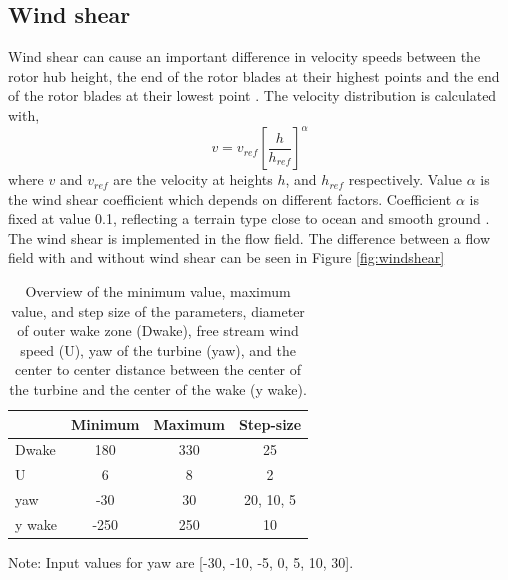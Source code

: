 \subsection{Wind shear}
Wind shear can cause an important difference in velocity speeds between the rotor hub height, the end of the rotor blades at their highest points and the end of the rotor blades at their lowest point \cite{Firtin2011}.  The velocity distribution is calculated with, 
\begin{equation}
\label{eq:shear}
v = v_{ref} \left[\frac{h}{h_{ref}}\right]^\alpha
\end{equation}
where $v$ and $v_{ref}$ are the velocity at heights $h$, and $h_{ref}$  respectively. Value $\alpha$ is the wind shear coefficient which depends on different factors. Coefficient $\alpha$ is fixed at value 0.1, reflecting a terrain type close to ocean and smooth ground \cite{Firtin2011}. The wind shear is implemented in the flow field. The difference between a flow field with and without wind shear can be seen in Figure \ref{fig:windshear}





\begin{table}[h]
	\caption{Overview of the minimum value, maximum value, and step size of the parameters, diameter of outer wake zone (Dwake), free stream wind speed (U), yaw of the turbine (yaw), and the center to center distance between the center of the turbine and the center of the wake (y wake).}
	\centering
	\label{tab:pars}
	\begin{tabular}{lccc}
		\hline
	 	& Minimum & Maximum & Step-size \\ 
		\hline
		Dwake & 180 & 330 & 25 \\
		U & 6 & 8 & 2 \\
		yaw & -30 & 30 & 20, 10, 5 \\
		y wake & -250 & 250 & 10 \\
		\hline
	\end{tabular}
Note: Input values for yaw are [-30, -10, -5, 0, 5, 10, 30].
\end{table}


